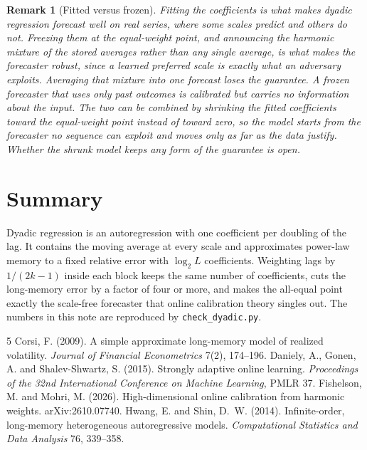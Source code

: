 \documentclass[11pt]{article}
\newtheorem{remark}{Remark}
\begin{document}
\begin{remark}[Fitted versus frozen]
Fitting the coefficients is what makes dyadic regression forecast well on real series, where some
scales predict and others do not. Freezing them at the equal-weight point, and announcing the harmonic mixture of
the stored averages rather than any single average, is what makes the \citet{fishelson2026}
forecaster robust, since a learned preferred scale is exactly what an adversary exploits. Averaging
that mixture into one forecast loses the guarantee. A frozen forecaster that uses only past outcomes is calibrated but carries no
information about the input. The two can be combined by shrinking the fitted coefficients toward
the equal-weight point instead of toward zero, so the model starts from the forecaster no sequence
can exploit and moves only as far as the data justify. Whether the shrunk model keeps any form of the
guarantee is open.
\end{remark}

\section{Summary}

Dyadic regression is an autoregression with one coefficient per doubling of the lag. It contains
the moving average at every scale and approximates power-law memory to a fixed relative error with
$\log_2 L$ coefficients. Weighting lags by $1/(2k-1)$ inside each block keeps the same number of
coefficients, cuts the long-memory error by a factor of four or more, and makes the all-equal point
exactly the scale-free forecaster that online calibration theory singles out. The numbers in this note are reproduced by \texttt{check\_dyadic.py}.

\begin{thebibliography}{5}
 Corsi, F. (2009). A simple approximate long-memory model of
  realized volatility. \emph{Journal of Financial Econometrics} 7(2), 174--196.
 Daniely, A., Gonen, A. and Shalev-Shwartz, S. (2015).
  Strongly adaptive online learning. \emph{Proceedings of the 32nd International Conference on
  Machine Learning}, PMLR 37.
 Fishelson, M. and Mohri, M. (2026).
  High-dimensional online calibration from harmonic weights. arXiv:2610.07740.
 Hwang, E. and Shin, D.~W. (2014). Infinite-order,
  long-memory heterogeneous autoregressive models. \emph{Computational Statistics and Data
  Analysis} 76, 339--358.
\end{thebibliography}
\end{document}
